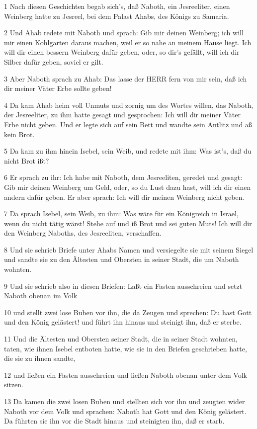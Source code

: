 \par 1 Nach diesen Geschichten begab sich's, daß Naboth, ein Jesreeliter, einen Weinberg hatte zu Jesreel, bei dem Palast Ahabs, des Königs zu Samaria.
\par 2 Und Ahab redete mit Naboth und sprach: Gib mir deinen Weinberg; ich will mir einen Kohlgarten daraus machen, weil er so nahe an meinem Hause liegt. Ich will dir einen bessern Weinberg dafür geben, oder, so dir's gefällt, will ich dir Silber dafür geben, soviel er gilt.
\par 3 Aber Naboth sprach zu Ahab: Das lasse der HERR fern von mir sein, daß ich dir meiner Väter Erbe sollte geben!
\par 4 Da kam Ahab heim voll Unmuts und zornig um des Wortes willen, das Naboth, der Jesreeliter, zu ihm hatte gesagt und gesprochen: Ich will dir meiner Väter Erbe nicht geben. Und er legte sich auf sein Bett und wandte sein Antlitz und aß kein Brot.
\par 5 Da kam zu ihm hinein Isebel, sein Weib, und redete mit ihm: Was ist's, daß du nicht Brot ißt?
\par 6 Er sprach zu ihr: Ich habe mit Naboth, dem Jesreeliten, geredet und gesagt: Gib mir deinen Weinberg um Geld, oder, so du Lust dazu hast, will ich dir einen andern dafür geben. Er aber sprach: Ich will dir meinen Weinberg nicht geben.
\par 7 Da sprach Isebel, sein Weib, zu ihm: Was wäre für ein Königreich in Israel, wenn du nicht tätig wärst! Stehe auf und iß Brot und sei guten Muts! Ich will dir den Weinberg Naboths, des Jesreeliten, verschaffen.
\par 8 Und sie schrieb Briefe unter Ahabs Namen und versiegelte sie mit seinem Siegel und sandte sie zu den Ältesten und Obersten in seiner Stadt, die um Naboth wohnten.
\par 9 Und sie schrieb also in diesen Briefen: Laßt ein Fasten ausschreien und setzt Naboth obenan im Volk
\par 10 und stellt zwei lose Buben vor ihn, die da Zeugen und sprechen: Du hast Gott und den König gelästert! und führt ihn hinaus und steinigt ihn, daß er sterbe.
\par 11 Und die Ältesten und Obersten seiner Stadt, die in seiner Stadt wohnten, taten, wie ihnen Isebel entboten hatte, wie sie in den Briefen geschrieben hatte, die sie zu ihnen sandte,
\par 12 und ließen ein Fasten ausschreien und ließen Naboth obenan unter dem Volk sitzen.
\par 13 Da kamen die zwei losen Buben und stellten sich vor ihn und zeugten wider Naboth vor dem Volk und sprachen: Naboth hat Gott und den König gelästert. Da führten sie ihn vor die Stadt hinaus und steinigten ihn, daß er starb.
